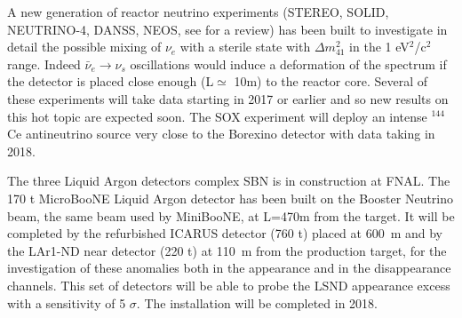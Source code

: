 A new generation of reactor neutrino experiments (STEREO, SOLID, NEUTRINO-4, DANSS, NEOS, see \cite{othervsbl} for a review) has been built to investigate in detail the possible mixing of $\nu_e$ with a sterile state with $\Delta m^2_{41}$ in the 1 eV$^2$/c$^2$ range.
Indeed $\bar{\nu}_e \rightarrow \nu_s$ oscillations would induce a deformation of the spectrum if the detector is placed close enough (L$\simeq$ 10m) to the reactor core. Several of these experiments will take data starting in 2017 or earlier and so new results on this hot topic are expected soon.
The SOX experiment \cite{cribier} will deploy an intense $^{144}$Ce antineutrino source very close to the Borexino detector with data taking in 2018.

The three Liquid Argon detectors complex SBN \cite{sbnfnal} is in construction at FNAL. The 170 t MicroBooNE Liquid Argon detector has been built on the Booster Neutrino beam, the same beam used by MiniBooNE, at L=470m from the target. It will be completed by the refurbished ICARUS detector (760 t) placed at 600~m and by the LAr1-ND near detector (220 t)  at 110~m from the production target, for the investigation of these anomalies both in the appearance and in the disappearance channels. This set of detectors will be able to probe the LSND appearance excess with a sensitivity of 5 $\sigma$. The installation will be completed in 2018.    

